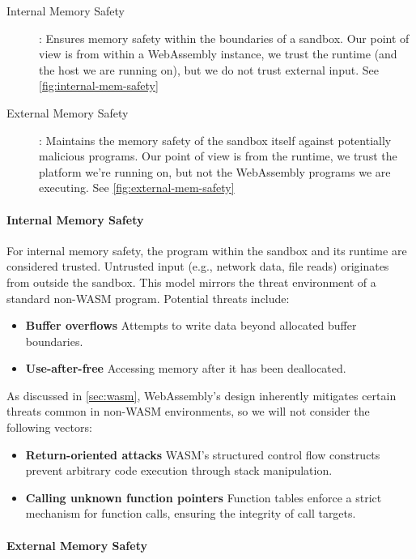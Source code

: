 \begin{description}
    \item[Internal Memory Safety]: Ensures memory safety within the boundaries of a sandbox.
    Our point of view is from within a WebAssembly instance, we trust the runtime (and the host we are running on), but we do not trust external input.
    See \cref{fig:internal-mem-safety}
    \item[External Memory Safety]: Maintains the memory safety of the sandbox itself against potentially malicious programs.
    Our point of view is from the runtime, we trust the platform we're running on, but not the WebAssembly programs we are executing.
    See \cref{fig:external-mem-safety}
\end{description}

\paragraph{Internal Memory Safety}
For internal memory safety, the program within the sandbox and its runtime are considered trusted.
Untrusted input (e.g., network data, file reads) originates from outside the sandbox.
This model mirrors the threat environment of a standard non-\ac{WASM} program.
Potential threats include:

\begin{itemize}
    \item \textbf{Buffer overflows} Attempts to write data beyond allocated buffer boundaries.
    \item \textbf{Use-after-free} Accessing memory after it has been deallocated.
\end{itemize}

As discussed in \cref{sec:wasm}, WebAssembly's design inherently mitigates certain threats common in non-\ac{WASM} environments, so we will not consider the following vectors:

\begin{itemize}
    \item \textbf{Return-oriented attacks} {\ac{WASM}'s} structured control flow constructs prevent arbitrary code execution through stack manipulation.
    \item \textbf{Calling unknown function pointers} Function tables enforce a strict mechanism for function calls, ensuring the integrity of call targets.
\end{itemize}

\paragraph{External Memory Safety}

